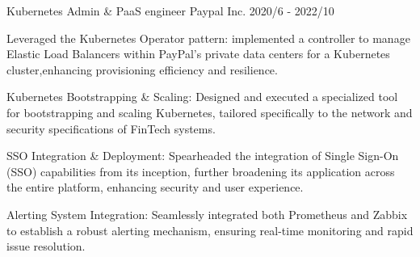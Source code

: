 \begin{cventries}
  
  \cventry
    {Kubernetes Admin \& PaaS engineer} %
    {Paypal Inc.} %
    {} %
    {2020/6 - 2022/10} %
    {
      \begin{cvitems} %
        \item {Leveraged the Kubernetes Operator pattern: implemented a controller to manage Elastic Load Balancers within PayPal's private data centers for a Kubernetes cluster,enhancing provisioning efficiency and resilience. }
        \item {Kubernetes Bootstrapping \& Scaling: Designed and executed a specialized tool for bootstrapping and scaling Kubernetes, tailored specifically to the network and security specifications of FinTech systems. }
        \item { SSO Integration \& Deployment: Spearheaded the integration of Single Sign-On (SSO) capabilities from its inception, further broadening its application across the entire platform, enhancing security and user experience. }
        \item {Alerting System Integration: Seamlessly integrated both Prometheus and Zabbix to establish a robust alerting mechanism, ensuring real-time monitoring and rapid issue resolution. }
      \end{cvitems}
    }



\end{cventries}
